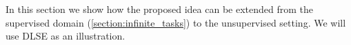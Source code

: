 %
%
%
%
%
%
In this section we show how the proposed idea can be extended from the
supervised domain (\cref{section:infinite_tasks}) to the unsupervised setting.
We will use \ac{DLSE} as an illustration.  

%
